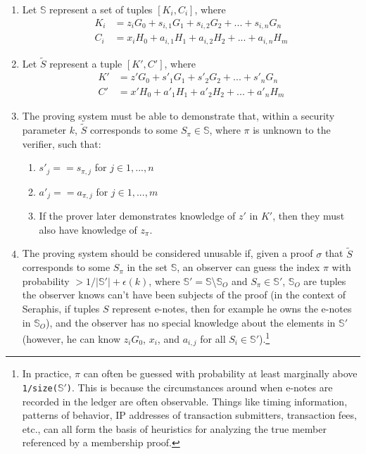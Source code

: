 \begin{enumerate}
    \item Let $\mathbb{S}$ represent a set of tuples $[K_i, C_i]$, where\vspace{.115cm}
    \begin{align*}
        K_i &= z_i G_0 + s_{i,1} G_1 + s_{i,2} G_2 + ... + s_{i,n} G_n \\
        C_i &= x_i H_0 + a_{i,1} H_1 + a_{i,2} H_2 + ... + a_{i,n} H_m
    \end{align*}

    \item Let $\tilde{S}$ represent a tuple $[K', C']$, where\vspace{.115cm}
    \begin{align*}
        K' &= z' G_0 + s'_1 G_1 + s'_2 G_2 + ... + s'_n G_n \\
        C' &= x' H_0 + a'_1 H_1 + a'_2 H_2 + ... + a'_n H_m
    \end{align*}

    \item The proving system must be able to demonstrate that, within a security parameter $k$, $\tilde{S}$ corresponds to some $S_{\pi} \in \mathbb{S}$, where $\pi$ is unknown to the verifier, such that:
    \begin{enumerate}
        \item $s'_j == s_{\pi,j}$ for $j \in 1,...,n$
        \item $a'_j == a_{\pi,j}$ for $j \in 1,...,m$
        \item If the prover later demonstrates knowledge of $z'$ in $K'$, then they must also have knowledge of $z_{\pi}$.
    \end{enumerate}
    
    \item The proving system should be considered unusable if, given a proof $\sigma$ that $\tilde{S}$ corresponds to some $S_{\pi}$ in the set $\mathbb{S}$, an observer can guess the index $\pi$ with probability $> 1/|\mathbb{S}'| + \epsilon(k)$, where $\mathbb{S}' = \mathbb{S}$\textbackslash$\mathbb{S}_O$ and $S_{\pi} \in \mathbb{S}'$, $\mathbb{S}_O$ are tuples the observer knows can't have been subjects of the proof (in the context of Seraphis, if tuples $S$ represent e-notes, then for example he owns the e-notes in $\mathbb{S}_O$), and the observer has no special knowledge about the elements in $\mathbb{S}'$ (however, he can know $z_i G_0$, $x_i$, and $a_{i,j}$ for all $S_i \in \mathbb{S}'$).\footnote{In practice, $\pi$ can often be guessed with probability at least marginally above {\tt 1/size(}$\mathbb{S}'${\tt )}. This is because the circumstances around when e-notes are recorded in the ledger are often observable. Things like timing information, patterns of behavior, IP addresses of transaction submitters, transaction fees, etc., can all form the basis of heuristics for analyzing the true member referenced by a membership proof.}
\end{enumerate}

